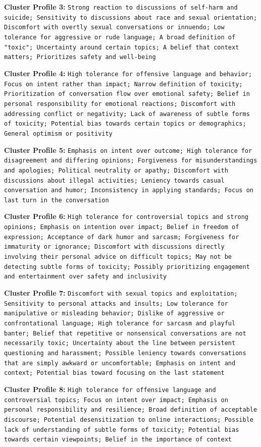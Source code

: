 \documentclass[11pt]{article}
\begin{document}
\textbf{Cluster Profile 3:} \texttt{Strong reaction to discussions of self-harm and suicide; Sensitivity to discussions about race and sexual orientation; Discomfort with overtly sexual conversations or innuendo; Low tolerance for aggressive or rude language; A broad definition of "toxic"; Uncertainty around certain topics; A belief that context matters; Prioritizes safety and well-being}


\textbf{Cluster Profile 4:} \texttt{High tolerance for offensive language and behavior; Focus on intent rather than impact; Narrow definition of toxicity; Prioritization of conversation flow over emotional safety; Belief in personal responsibility for emotional reactions; Discomfort with addressing conflict or negativity; Lack of awareness of subtle forms of toxicity; Potential bias towards certain topics or demographics; General optimism or positivity}


\textbf{Cluster Profile 5:} \texttt{Emphasis on intent over outcome; High tolerance for disagreement and differing opinions; Forgiveness for misunderstandings and apologies; Political neutrality or apathy; Discomfort with discussions about illegal activities; Leniency towards casual conversation and humor; Inconsistency in applying standards; Focus on last turn in the conversation}


\textbf{Cluster Profile 6:} \texttt{High tolerance for controversial topics and strong opinions; Emphasis on intention over impact; Belief in freedom of expression; Acceptance of dark humor and sarcasm; Forgiveness for immaturity or ignorance; Discomfort with discussions directly involving their personal advice on difficult topics; May not be detecting subtle forms of toxicity; Possibly prioritizing engagement and entertainment over safety and inclusivity}


\textbf{Cluster Profile 7:} \texttt{Discomfort with sexual topics and exploitation; Sensitivity to personal attacks and insults; Low tolerance for manipulative or misleading behavior; Dislike of aggressive or confrontational language; High tolerance for sarcasm and playful banter; Belief that repetitive or nonsensical conversations are not necessarily toxic; Uncertainty about the line between persistent questioning and harassment; Possible leniency towards conversations that are simply awkward or uncomfortable; Emphasis on intent and context; Potential bias toward focusing on the last statement}


\textbf{Cluster Profile 8:} \texttt{High tolerance for offensive language and controversial topics; Focus on intent over impact; Emphasis on personal responsibility and resilience; Broad definition of acceptable discourse; Potential desensitization to online interactions; Possible lack of understanding of subtle forms of toxicity; Potential bias towards certain viewpoints; Belief in the importance of context}
\end{document}
